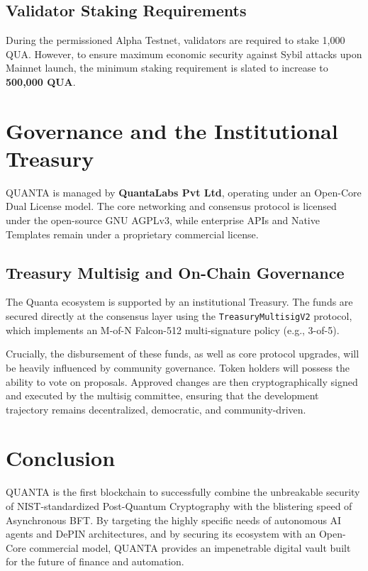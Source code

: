 \documentclass[11pt,a4paper]{article}
\begin{document}
\subsection{Validator Staking Requirements}
During the permissioned Alpha Testnet, validators are required to stake 1,000 QUA. However, to ensure maximum economic security against Sybil attacks upon Mainnet launch, the minimum staking requirement is slated to increase to \textbf{500,000 QUA}. 

\section{Governance and the Institutional Treasury}
QUANTA is managed by \textbf{QuantaLabs Pvt Ltd}, operating under an Open-Core Dual License model. The core networking and consensus protocol is licensed under the open-source GNU AGPLv3, while enterprise APIs and Native Templates remain under a proprietary commercial license.

\subsection{Treasury Multisig and On-Chain Governance}
The Quanta ecosystem is supported by an institutional Treasury. The funds are secured directly at the consensus layer using the \texttt{TreasuryMultisigV2} protocol, which implements an M-of-N Falcon-512 multi-signature policy (e.g., 3-of-5). 

Crucially, the disbursement of these funds, as well as core protocol upgrades, will be heavily influenced by community governance. Token holders will possess the ability to vote on proposals. Approved changes are then cryptographically signed and executed by the multisig committee, ensuring that the development trajectory remains decentralized, democratic, and community-driven.

\section{Conclusion}
QUANTA is the first blockchain to successfully combine the unbreakable security of NIST-standardized Post-Quantum Cryptography with the blistering speed of Asynchronous BFT. By targeting the highly specific needs of autonomous AI agents and DePIN architectures, and by securing its ecosystem with an Open-Core commercial model, QUANTA provides an impenetrable digital vault built for the future of finance and automation.
\end{document}
